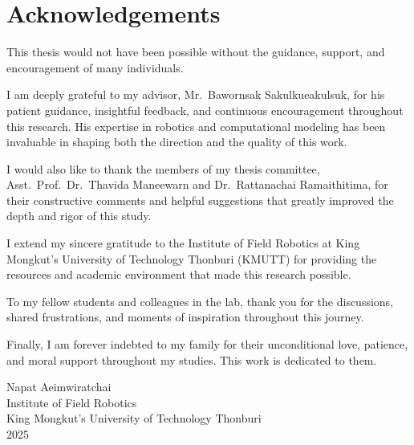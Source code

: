 \newpage
\chapter*{Acknowledgements}
\noindent

This thesis would not have been possible without the guidance, support, and encouragement of many individuals.

I am deeply grateful to my advisor, Mr.\ Bawornsak Sakulkueakulsuk, for his patient guidance, insightful feedback, and continuous encouragement throughout this research.
His expertise in robotics and computational modeling has been invaluable in shaping both the direction and the quality of this work.

I would also like to thank the members of my thesis committee, Asst.\ Prof.\ Dr.\ Thavida Maneewarn and Dr.\ Rattanachai Ramaithitima, for their constructive comments and helpful suggestions that greatly improved the depth and rigor of this study.

I extend my sincere gratitude to the Institute of Field Robotics at King Mongkut's University of Technology Thonburi (KMUTT) for providing the resources and academic environment that made this research possible.

To my fellow students and colleagues in the lab, thank you for the discussions, shared frustrations, and moments of inspiration throughout this journey.

Finally, I am forever indebted to my family for their unconditional love, patience, and moral support throughout my studies.
This work is dedicated to them.

\vfill
\noindent Napat Aeimwiratchai\\
Institute of Field Robotics\\
King Mongkut's University of Technology Thonburi\\
2025
